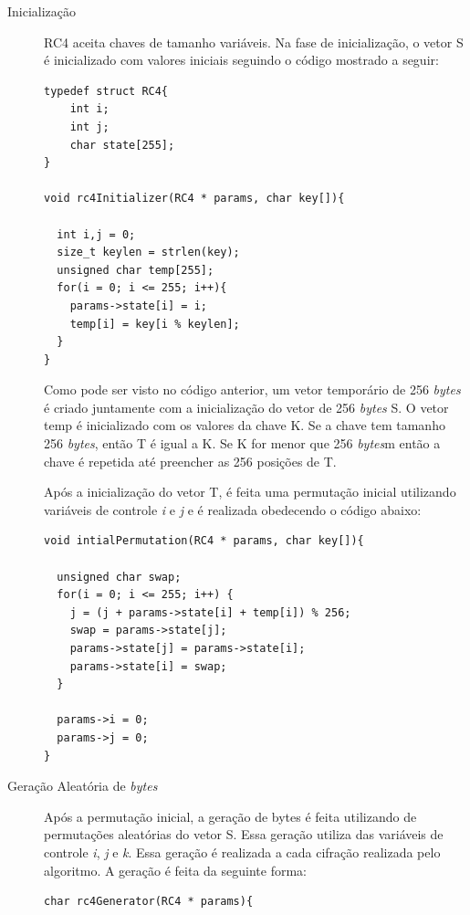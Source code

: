 \begin{description}

	\item [Inicialização] RC4 aceita chaves de tamanho variáveis. Na fase de inicialização, o vetor S é inicializado com valores iniciais seguindo o código mostrado a seguir:
	
    \begin{lstlisting}[caption={Código 
Inicialização}, label=inicialization]
typedef struct RC4{
	int i;
	int j;
	char state[255];
}

void rc4Initializer(RC4 * params, char key[]){

  int i,j = 0;
  size_t keylen = strlen(key);
  unsigned char temp[255];
  for(i = 0; i <= 255; i++){
    params->state[i] = i;
    temp[i] = key[i % keylen];
  }
}
    \end{lstlisting}

Como pode ser visto no código anterior, um vetor temporário de 256 \textit{bytes} é criado juntamente com a inicialização do vetor de 256 \textit{bytes} S. O vetor temp é inicializado com os valores da chave K. Se a chave tem tamanho 256 \textit{bytes}, então T é igual a K. Se K for menor que 256 \textit{bytes}m então a chave é repetida até preencher as 256 posições de T.

Após a inicialização do vetor T, é feita uma permutação inicial utilizando variáveis de controle \textit{i} e \textit{j} e é realizada obedecendo o código abaixo:

    \begin{lstlisting}[caption={Código Permutação Inicial}, label=initialPermutation]
void intialPermutation(RC4 * params, char key[]){

  unsigned char swap;
  for(i = 0; i <= 255; i++) {
    j = (j + params->state[i] + temp[i]) % 256;
    swap = params->state[j];
    params->state[j] = params->state[i];
    params->state[i] = swap;
  }

  params->i = 0;
  params->j = 0;
}
    \end{lstlisting}

	\item [Geração Aleatória de \textit{bytes}] Após a permutação inicial, a geração de bytes é feita utilizando de permutações aleatórias do vetor S. Essa geração utiliza das variáveis de controle \textit{i}, \textit{j} e \textit{k}. Essa geração é realizada a cada cifração realizada pelo algoritmo. A geração é feita da seguinte forma:
	
    \begin{lstlisting}[caption={Código Geração Aleatório de \textit{bytes}}, label=randomGeneration]
char rc4Generator(RC4 * params){


\end{lstlisting}
\end{description}
